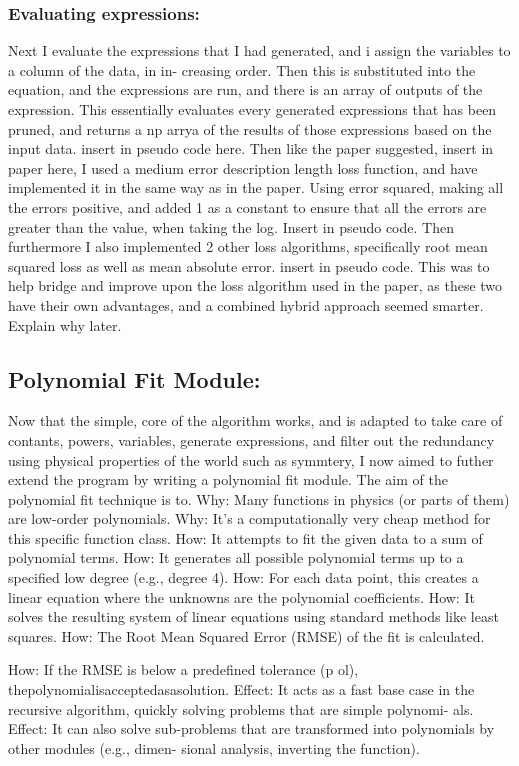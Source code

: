 \documentclass{article}
\begin{document}
\subsubsection{Evaluating expressions:}
Next I evaluate the expressions that I had generated, and i assign the variables to a column of the data, in in-
creasing order. Then this is substituted into the equation, and the expressions are run, and there is an array
of outputs of the expression. This essentially evaluates every generated expressions that has been pruned, and
returns a np arrya of the results of those expressions based on the input data.
insert in pseudo code here.
Then like the paper suggested, insert in paper here, I used a medium error description length loss function, and
have implemented it in the same way as in the paper. Using error squared, making all the errors positive, and
added 1 as a constant to ensure that all the errors are greater than the value, when taking the log.
Insert in pseudo code.
Then furthermore I also implemented 2 other loss algorithms, specifically root mean squared loss as well as
mean absolute error.
insert in pseudo code.
This was to help bridge and improve upon the loss algorithm used in the paper, as these two have their own
advantages, and a combined hybrid approach seemed smarter.
Explain why later.
\subsection{Polynomial Fit Module: }
Now that the simple, core of the algorithm works, and is adapted to take care of contants, powers, variables,
generate expressions, and filter out the redundancy using physical properties of the world such as symmtery,
I now aimed to futher extend the program by writing a polynomial fit module. The aim of the polynomial fit
technique is to.
Why: Many functions in physics (or parts of them) are low-order polynomials.
Why: It’s a computationally very cheap method for this specific function class.
How: It attempts to fit the given data to a sum of polynomial terms.
How: It generates all possible polynomial terms up to a specified low degree (e.g., degree 4).
How: For each data point, this creates a linear equation where the unknowns are the polynomial coefficients.
How: It solves the resulting system of linear equations using standard methods like least squares.
How: The Root Mean Squared Error (RMSE) of the fit is calculated.

How: If the RMSE is below a predefined tolerance (p ol), thepolynomialisacceptedasasolution.
Effect: It acts as a fast base case in the recursive algorithm, quickly solving problems that are simple polynomi-
als.
Effect: It can also solve sub-problems that are transformed into polynomials by other modules (e.g., dimen-
sional analysis, inverting the function).
\end{document}

